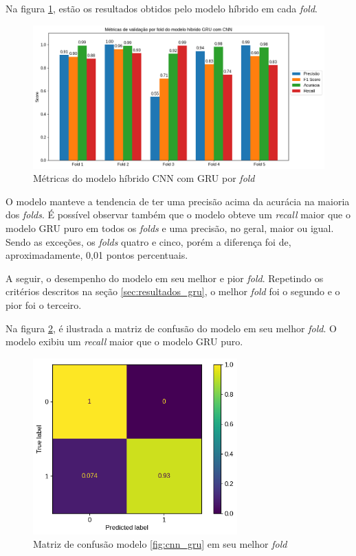 \documentclass[
    12pt,                %
    openright,           %
    oneside,             %
    a4paper,             %
    brazil               %
]{abntex2}
\begin{document}
Na figura \ref{fig:gru_cnn_resultados_por_fold}, estão os resultados obtidos pelo modelo híbrido em cada \textit{fold}.

\begin{figure}[H]
  \centering
   \includegraphics[width=1.0\textwidth]{figuras/modelos_resultados/gru_cnn/gru_cnn_metricas_por_fold.png} 
  \caption{Métricas do modelo híbrido CNN com GRU por \textit{fold}}
  \label{fig:gru_cnn_resultados_por_fold}
\end{figure}

O modelo manteve a tendencia de ter uma precisão acima da acurácia na maioria dos \textit{folds}. É possível observar também que o modelo
obteve um \textit{recall} maior que o modelo GRU puro em todos os \textit{folds} e uma precisão, no geral, maior ou igual. Sendo as exceções,
os \textit{folds} quatro e cinco, porém a diferença foi de, aproximadamente, 0,01 pontos percentuais. 

A seguir, o desempenho do modelo em seu melhor e pior \textit{fold}. Repetindo os critérios descritos na seção \ref{sec:resultados_gru}, o melhor
\textit{fold} foi o segundo e o pior foi o terceiro.

Na figura \ref{fig:matriz_confusao_cnn_gru_melhor_fold}, é ilustrada a matriz de confusão do modelo em seu melhor \textit{fold}. O modelo
exibiu um \textit{recall} maior que o modelo GRU puro.

\begin{figure}[H]
  \centering
   \includegraphics[width=0.7\textwidth]{figuras/modelos_resultados/gru_cnn/matriz_confusao_melhor_fold_gru_cnn_1.png} 
  \caption{Matriz de confusão modelo \ref{fig:cnn_gru} em seu melhor \textit{fold}}
  \label{fig:matriz_confusao_cnn_gru_melhor_fold}
\end{figure}
\end{document}
